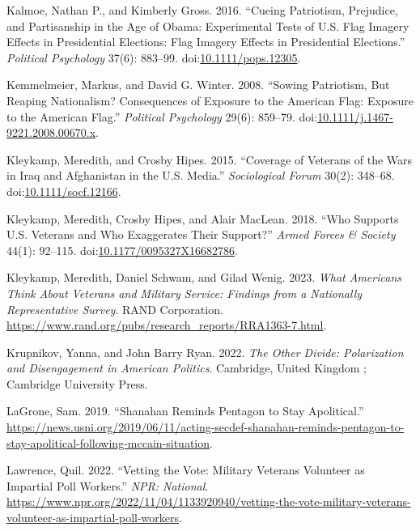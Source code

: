 \documentclass[
  12pt,
  letterpaper,
]{article}
\newlength{\cslhangindent}
\newenvironment{CSLReferences}[2] %
 {\begin{list}{}{%
  \setlength{\itemindent}{0pt}
  \setlength{\leftmargin}{0pt}
  \setlength{\parsep}{0pt}
  \ifodd #1
   \setlength{\leftmargin}{\cslhangindent}
   \setlength{\itemindent}{-1\cslhangindent}
  \fi
  \setlength{\itemsep}{#2\baselineskip}}}
 {\end{list}}
\begin{document}
\begin{CSLReferences}{1}{1}
Kalmoe, Nathan P., and Kimberly Gross. 2016. {``Cueing {Patriotism},
{Prejudice}, and {Partisanship} in the {Age} of {Obama}: {Experimental
Tests} of {U}.{S}. {Flag Imagery Effects} in {Presidential Elections}:
{Flag Imagery Effects} in {Presidential Elections}.''} \emph{Political
Psychology} 37(6): 883--99.
doi:\href{https://doi.org/10.1111/pops.12305}{10.1111/pops.12305}.

Kemmelmeier, Markus, and David G. Winter. 2008. {``Sowing {Patriotism},
{But Reaping Nationalism}? {Consequences} of {Exposure} to the {American
Flag}: {Exposure} to the {American Flag}.''} \emph{Political Psychology}
29(6): 859--79.
doi:\href{https://doi.org/10.1111/j.1467-9221.2008.00670.x}{10.1111/j.1467-9221.2008.00670.x}.

Kleykamp, Meredith, and Crosby Hipes. 2015. {``Coverage of {Veterans} of
the {Wars} in {Iraq} and {Afghanistan} in the {U}.{S}. {Media}.''}
\emph{Sociological Forum} 30(2): 348--68.
doi:\href{https://doi.org/10.1111/socf.12166}{10.1111/socf.12166}.

Kleykamp, Meredith, Crosby Hipes, and Alair MacLean. 2018. {``Who
{Supports U}.{S}. {Veterans} and {Who Exaggerates Their Support}?''}
\emph{Armed Forces \& Society} 44(1): 92--115.
doi:\href{https://doi.org/10.1177/0095327X16682786}{10.1177/0095327X16682786}.

Kleykamp, Meredith, Daniel Schwam, and Gilad Wenig. 2023. \emph{What
{Americans Think About Veterans} and {Military Service}: {Findings} from
a {Nationally Representative Survey}}. RAND Corporation.
\url{https://www.rand.org/pubs/research_reports/RRA1363-7.html}.

Krupnikov, Yanna, and John Barry Ryan. 2022. \emph{The Other Divide:
Polarization and Disengagement in {American} Politics}. Cambridge,
United Kingdom ; Cambridge University Press.

LaGrone, Sam. 2019. {``Shanahan {Reminds Pentagon} to {Stay
Apolitical}.''}
\url{https://news.usni.org/2019/06/11/acting-secdef-shanahan-reminds-pentagon-to-stay-apolitical-following-mccain-situation}.

Lawrence, Quil. 2022. {``Vetting the {Vote}: {Military} Veterans
Volunteer as Impartial Poll Workers.''} \emph{NPR: National}.
\url{https://www.npr.org/2022/11/04/1133920940/vetting-the-vote-military-veterans-volunteer-as-impartial-poll-workers}.


\end{CSLReferences}
\end{document}
